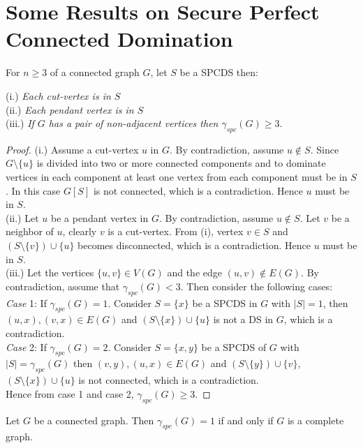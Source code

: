 \section{Some Results on Secure Perfect Connected Domination}
\begin{proposition}
For $n \geq 3$ of a connected graph $G$, let $S$ be a SPCDS then:
\end{proposition}
\noindent (i.) \textit{Each cut-vertex is in $S$\\}
(ii.) \textit{Each pendant vertex is in $S$\\}
(iii.) \textit{If $G$ has a pair of non-adjacent vertices then $\gamma_{spc}(G) \geq 3$}.
\begin{proof}
(i.) Assume a cut-vertex $u$ in $G$. By contradiction, assume $u \notin S$. Since $G\setminus \lbrace u \rbrace$ is divided into two or more connected components and to dominate vertices in each component at least one vertex from each component must be in $S$. In this case $G[S]$ is not connected, which is a contradiction. Hence $u$ must be in $S$.\\
(ii.) Let $u$ be a pendant vertex in $G$. By contradiction, assume $u \notin S$. Let $v$ be a neighbor of $u$, clearly $v$ is a cut-vertex. From (i), vertex $v \in S$ and $(S\setminus \lbrace v \rbrace ) \cup \lbrace u \rbrace$ becomes disconnected, which is a contradiction. Hence $u$ must be in $S$.\\
(iii.) Let the vertices $\{u,v\} \in V(G)$ and the edge $(u,v) \notin E(G)$. By contradiction, assume that $\gamma_{spc}(G) < 3$. Then consider the following cases:\\
\textit{Case }1: If $\gamma_{spc}(G) = 1$. Consider $S= \{ x \}$ be a SPCDS in $G$ with $|S|=1$, then $(u,x),(v,x) \in E(G)$ and  $(S\setminus \lbrace x \rbrace) \cup \lbrace u \rbrace$ is not a DS in $G$, which is a contradiction.\\
\textit{Case }2: If $\gamma_{spc}(G) = 2$. Consider $S=\{ x,y \}$ be a SPCDS of $G$ with $|S|=\gamma_{spc}(G)$ then $ (v,y),(u,x) \in E(G)$ and $(S\setminus \lbrace y \rbrace ) \cup \lbrace v \rbrace$, $(S\setminus \lbrace x \rbrace ) \cup \lbrace u \rbrace$ is not connected, which is a contradiction.\\ Hence from case 1 and case 2, $\gamma_{spc}(G) \geq 3$.
\end{proof}
\begin{proposition}
Let $G$ be a connected graph. Then $\gamma_{spc}(G)=1$ if and only if $G$ is a complete graph.  
\end{proposition}
